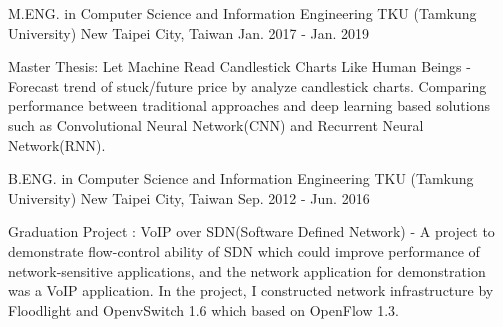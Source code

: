 

\begin{cventries}

    \cventry
        {M.ENG. in Computer Science and Information Engineering}
        {TKU (Tamkung University)}
        {New Taipei City, Taiwan}
        {Jan. 2017 - Jan. 2019}
        {
            \begin{cvitems}
                \item 
                    {
                        Master Thesis: Let Machine Read Candlestick Charts Like Human Beings - Forecast trend of stuck/future price by analyze candlestick charts. Comparing performance between traditional approaches and deep learning based solutions such as Convolutional Neural Network(CNN) and Recurrent Neural Network(RNN).
                    }
            \end{cvitems}
        }

    \cventry
        {B.ENG. in Computer Science and Information Engineering}
        {TKU (Tamkung University)}
        {New Taipei City, Taiwan}
        {Sep. 2012 - Jun. 2016}
        {
            \begin{cvitems}
                \item 
                    {
                        Graduation Project : VoIP over SDN(Software Defined Network) - A project to demonstrate flow-control ability of SDN which could improve performance of network-sensitive applications, and the network application for demonstration was a VoIP application. In the project, I constructed network infrastructure by Floodlight and OpenvSwitch 1.6 which based on OpenFlow 1.3.
                    }
            \end{cvitems}
        }
    


\end{cventries}
